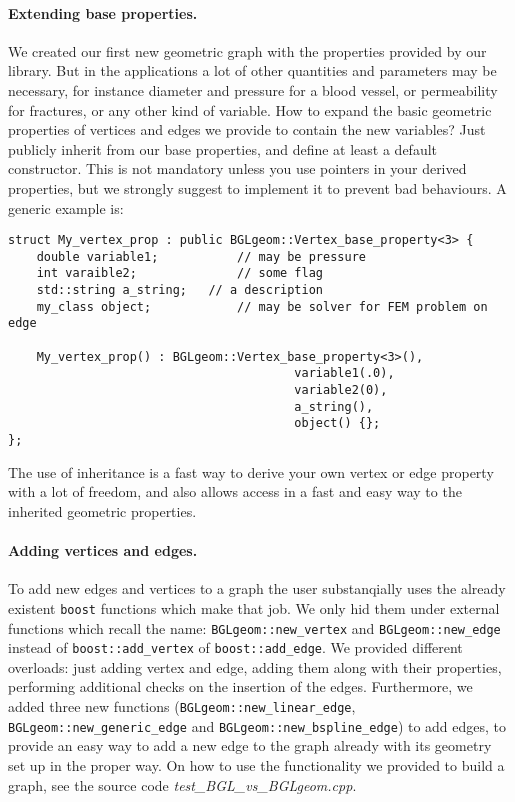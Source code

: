 \documentclass[11pt]{article} %
\begin{document}
		\paragraph{Extending base properties.} We created our first new geometric graph with the properties provided by our library. But in the applications a lot of other quantities and parameters may be necessary, for instance diameter and pressure for a blood vessel, or permeability for fractures, or any other kind of variable. How to expand the basic geometric properties of vertices and edges we provide to contain the new variables? Just publicly inherit from our base properties, and define at least a default constructor. This is not mandatory unless you use pointers in your derived properties, but we strongly suggest to implement it to prevent bad behaviours. A generic example is:
\begin{lstlisting}[frame=trbl]
struct My_vertex_prop : public BGLgeom::Vertex_base_property<3> {
	double variable1;			// may be pressure
	int varaible2;				// some flag
	std::string a_string;	// a description
	my_class object;			// may be solver for FEM problem on edge
	
	My_vertex_prop() : BGLgeom::Vertex_base_property<3>(),
										variable1(.0),
										variable2(0),
										a_string(),
										object() {};	
};
\end{lstlisting}
		The use of inheritance is a fast way to derive your own vertex or edge property with a lot of freedom, and also allows access in a fast and easy way to the inherited geometric properties.
		\paragraph{Adding vertices and edges.} To add new edges and vertices to a graph the user substanqially uses the already existent \texttt{boost} functions which make that job. We only hid them under external functions which recall the name: \texttt{BGLgeom::new\_vertex} and \texttt{BGLgeom::new\_edge} instead of \texttt{boost::add\_vertex} of \texttt{boost::add\_edge}. We provided different overloads: just adding vertex and edge, adding them along with their properties, performing additional checks on the insertion of the edges. Furthermore, we added three new functions (\texttt{BGLgeom::new\_linear\_edge}, \texttt{BGLgeom::new\_generic\_edge} and \texttt{BGLgeom::new\_bspline\_edge}) to add edges, to provide an easy way to add a new edge to the graph already with its geometry set up in the proper way.	On how to use the functionality we provided to build a graph, see the source code \textit{test\_BGL\_vs\_BGLgeom.cpp}.
	
\end{document}
